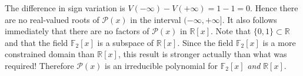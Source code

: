 \documentclass{AssignmentCUNY}
\begin{document}
The difference in sign variation is $V(-\infty) - V(+\infty) = 1 - 1 = 0$.
Hence there are no real-valued roots of $\mathcal{P}(x)$ in the interval $(-\infty, +\infty]$.
It also follows immediately that there are no factors of $\mathcal{P}(x)$ in $\mathbb{R}\left[x\right]$.
Note that $\{0,1\} \subset \mathbb{R}$ and that the field $\mathbb{F}_{2}\left[x\right]$ is a subspace of $\mathbb{R}\left[x\right]$.
Since the field $\mathbb{F}_{2}\left[x\right]$ is a more constrained domain than $\mathbb{R}\left[x\right]$, this result is stronger actually than what was required!
Therefore $\mathcal{P}(x)$ is an irreducible polynomial for $\mathbb{F}_{2}\left[x\right]$ \emph{and} $\mathbb{R}\left[x\right]$.
\end{document}
